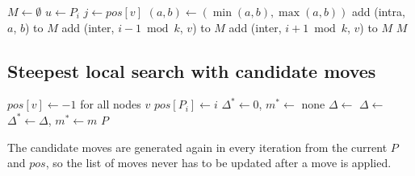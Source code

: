 \documentclass[11pt,a4paper]{article}
\begin{document}
\begin{algorithm}[H]
\caption{Generating the candidate moves}
\begin{algorithmic}[1]
  \State $M \gets \emptyset$
    \State $u \gets P_i$
      \State $j \gets \mathit{pos}[v]$
       
          \State $(a, b) \gets (\min(a, b), \max(a, b))$
           
            \State add (intra, $a$, $b$) to $M$
          \EndIf
        \EndFor
      \Else {}
        \State add (inter, $i - 1 \bmod k$, $v$) to $M$
        \State add (inter, $i + 1 \bmod k$, $v$) to $M$
      \EndIf
    \EndFor
  \EndFor
  \State \Return $M$
\EndFunction
\end{algorithmic}
\end{algorithm}

\subsection*{Steepest local search with candidate moves}
\begin{algorithm}[H]
\caption{Steepest local search with candidate moves}
\begin{algorithmic}[1]
  \State $\mathit{pos}[v] \gets -1$ for all nodes $v$
    \State $\mathit{pos}[P_i] \gets i$
  \EndFor
  \Loop
    \State $\Delta^* \gets 0$, $m^* \gets$ none 
        \State $\Delta \gets$ 
      \Else
        \State $\Delta \gets$ 
      \EndIf
      \If{$\Delta < \Delta^*$}
        \State $\Delta^* \gets \Delta$, $m^* \gets m$
      \EndIf
    \EndFor
     
      \State \Return $P$
    \EndIf
    \State {}
  \EndLoop
\EndFunction
\end{algorithmic}
\end{algorithm}
The candidate moves are generated again in every iteration from the current $P$ and
$\mathit{pos}$, so the list of moves never has to be updated after a move is applied.
\end{document}
